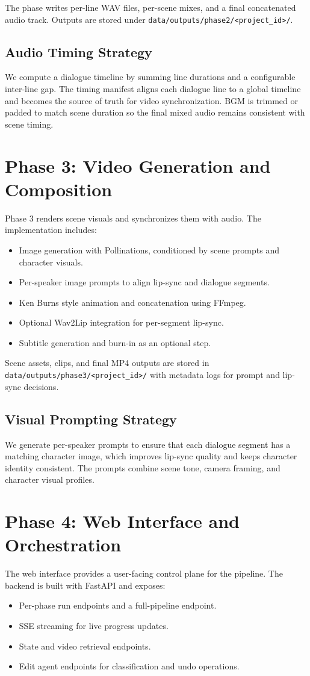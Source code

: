 \documentclass[11pt]{article}
\begin{document}
The phase writes per-line WAV files, per-scene mixes, and a final concatenated audio track. Outputs are stored under \texttt{data/outputs/phase2/<project\_id>/}.

\subsection{Audio Timing Strategy}
We compute a dialogue timeline by summing line durations and a configurable inter-line gap. The timing manifest aligns each dialogue line to a global timeline and becomes the source of truth for video synchronization. BGM is trimmed or padded to match scene duration so the final mixed audio remains consistent with scene timing.

\section{Phase 3: Video Generation and Composition}
Phase 3 renders scene visuals and synchronizes them with audio. The implementation includes:
\begin{itemize}
  \item Image generation with Pollinations, conditioned by scene prompts and character visuals.
  \item Per-speaker image prompts to align lip-sync and dialogue segments.
  \item Ken Burns style animation and concatenation using FFmpeg.
  \item Optional Wav2Lip integration for per-segment lip-sync.
  \item Subtitle generation and burn-in as an optional step.
\end{itemize}

Scene assets, clips, and final MP4 outputs are stored in \texttt{data/outputs/phase3/<project\_id>/} with metadata logs for prompt and lip-sync decisions.

\subsection{Visual Prompting Strategy}
We generate per-speaker prompts to ensure that each dialogue segment has a matching character image, which improves lip-sync quality and keeps character identity consistent. The prompts combine scene tone, camera framing, and character visual profiles.

\section{Phase 4: Web Interface and Orchestration}
The web interface provides a user-facing control plane for the pipeline. The backend is built with FastAPI and exposes:
\begin{itemize}
  \item Per-phase run endpoints and a full-pipeline endpoint.
  \item SSE streaming for live progress updates.
  \item State and video retrieval endpoints.
  \item Edit agent endpoints for classification and undo operations.
\end{itemize}
\end{document}
